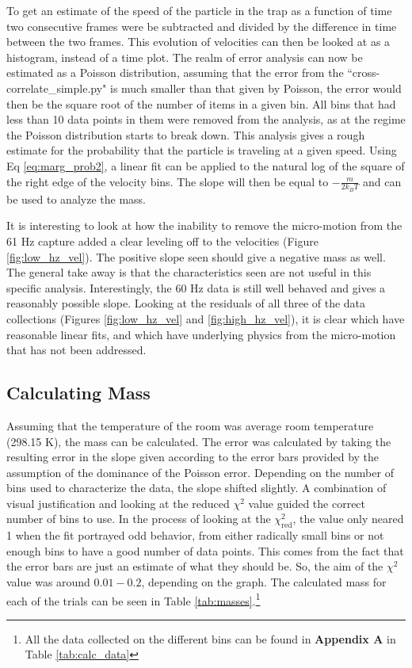 \documentclass[12pt]{article}
\begin{document}
To get an estimate of the speed of the particle in the trap as a function of time two consecutive frames were be subtracted and divided by the difference in time between the two frames. This evolution of velocities can then be looked at as a histogram, instead of a time plot. The realm of error analysis can now be estimated as a Poisson distribution, assuming that the error from the ``cross-correlate\_simple.py" is much smaller than that given by Poisson, the error would then be the square root of the number of items in a given bin. All bins that had less than 10 data points in them were removed from the analysis, as at the regime the Poisson distribution starts to break down. This analysis gives a rough estimate for the probability that the particle is traveling at a given speed. Using Eq \ref{eq:marg_prob2}, a linear fit can be applied to the natural log of the square of the right edge of the velocity bins. The slope will then be equal to $-\frac{m}{2 k_B T}$ and can be used to analyze the mass. 

It is interesting to look at how the inability to remove the micro-motion from the 61 Hz capture added a clear leveling off to the velocities (Figure \ref{fig:low_hz_vel}). The positive slope seen should give a negative mass as well. The general take away is that the characteristics seen are not useful in this specific analysis. Interestingly, the 60 Hz data is still well behaved and gives a reasonably possible slope. Looking at the residuals of all three of the data collections (Figures  \ref{fig:low_hz_vel} and \ref{fig:high_hz_vel}), it is clear which have reasonable linear fits, and which have underlying physics from the micro-motion that has not been addressed. 


\subsection{Calculating Mass}

Assuming that the temperature of the room was average room temperature (298.15 K), the mass can be calculated. The error was calculated by taking the resulting error in the slope given according to the error bars provided by the assumption of the dominance of the Poisson error. Depending on the number of bins used to characterize the data, the slope shifted slightly. A combination of visual justification and looking at the reduced $\chi^2$ value guided the correct number of bins to use. In the process of looking at the $\chi_\text{red}^2$, the value only neared 1 when the fit portrayed odd behavior, from either radically small bins or not enough bins to have a good number of data points. This comes from the fact that the error bars are just an estimate of what they should be. So, the aim of the $\chi^2$ value was around $0.01-0.2$, depending on the graph. The calculated mass for each of the trials can be seen in Table \ref{tab:masses}.\footnote{All the data collected on the different bins can be found in \textbf{Appendix A} in Table \ref{tab:calc_data}}
\end{document}
